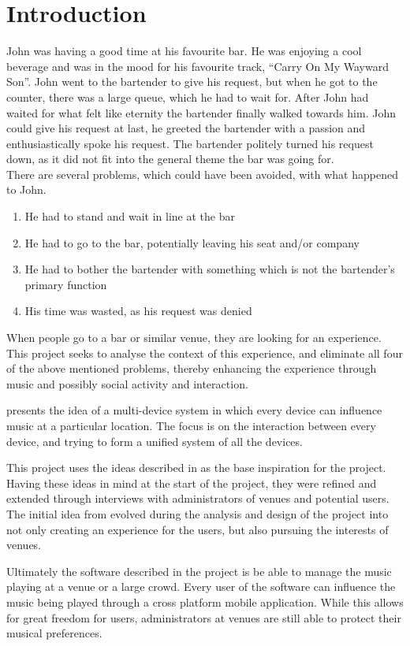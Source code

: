 \chapter{Introduction}\label{introduction} John was having a good time
at his favourite bar. He was enjoying a cool beverage and was in the
mood for his favourite track, \enquote{Carry On My Wayward Son}. John
went to the bartender to give his request, but when he got to the
counter, there was a large queue, which he had to wait for. After John
had waited for what felt like eternity the bartender finally walked
towards him. John could give his request at last, he greeted the
bartender with a passion and enthusiastically spoke his request. The
bartender politely turned his request down, as it did not fit into the
general theme the bar was going for.\\

There are several problems, which could have been avoided, with what
happened to John.
\begin{enumerate}
	\item He had to stand and wait in line at the bar
	\item He had to go to the bar, potentially leaving his seat and/or
company
	\item He had to bother the bartender with something which is
not the bartender's primary function
	\item His time was wasted, as his request was denied
\end{enumerate}

When people go to a bar or similar venue, they are looking for an
experience. This project seeks to analyse the context of this
experience, and eliminate all four of the above mentioned problems,
thereby enhancing the experience through music and possibly social
activity and interaction.

\cite{sorensen2012} presents the idea of a multi-device system in
which every device can influence music at a particular location. The
focus is on the interaction between every device, and trying to form a
unified system of all the devices.

This project uses the ideas described in \cite{sorensen2012} as the
base inspiration for the project. Having these ideas in mind at the start of the
project, they were refined and extended through interviews with
administrators of venues and potential users. The initial idea from
\cite{sorensen2012} evolved during the analysis and design of the
project into not only creating an experience for the users, but also
pursuing the interests of venues.

Ultimately the software described in the project is be able to manage
the music playing at a venue or a large crowd. Every user of the
software can influence the music being played through a cross platform
mobile application. While this allows for great freedom for users,
administrators at venues are still able to protect their musical
preferences.
